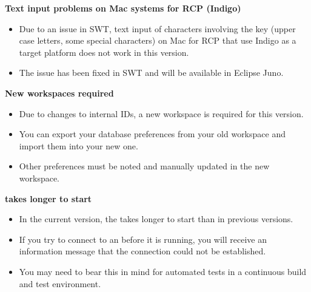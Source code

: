 \textbf{Text input problems on Mac systems for RCP (Indigo)}\\
\begin{itemize}
\item Due to an issue in SWT, text input of characters involving the  key (upper case letters, some special characters) on Mac for RCP \gdauts{} that use Indigo as a target platform does not work in this version.
\item The issue has been fixed in SWT and will be available in Eclipse Juno.
\end{itemize}



\textbf{New workspaces required}\\
\begin{itemize}
\item Due to changes to internal IDs, a new workspace is required for this version. 
\item You can export your database preferences from your old workspace and import them into your new one. 
\item Other preferences must be noted and manually updated in the new workspace. 
\end{itemize}

\textbf{\gdagent{} takes longer to start}
\begin{itemize}
\item In the current version, the \gdagent{} takes longer to start than in previous versions. 
\item If you try to connect to an \gdagent{} before it is running, you will receive an information message that the connection could not be established.
\item You may need to bear this in mind for automated tests in a continuous build and test environment.
\end{itemize}
